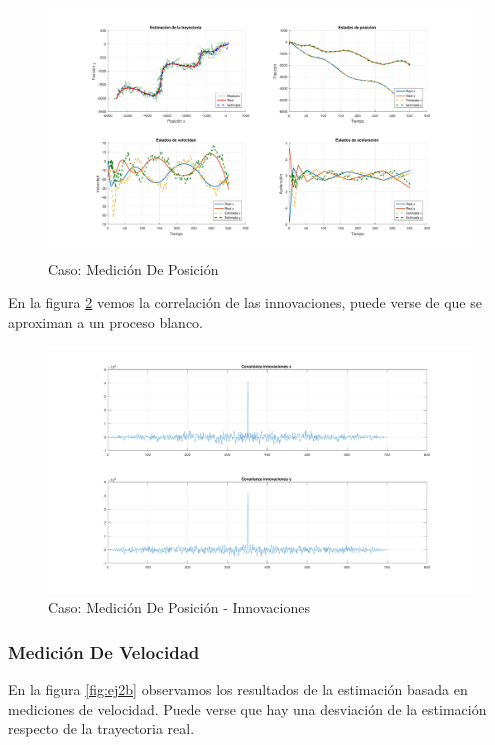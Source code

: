 		\begin{figure}[H]
			\centering
			\includegraphics[width=1.0\textwidth,keepaspectratio]{Figuras/graf_ej2a.pdf}
			\caption{Caso: Medición De Posición}
			\label{fig:ej2a}
		\end{figure}
		
		En la figura \ref{fig:ej2a_innov} vemos la correlación de las innovaciones, puede verse de que se aproximan a un proceso blanco.
		
		\begin{figure}[H]
			\centering
			\includegraphics[width=1.0\textwidth,keepaspectratio]{Figuras/covinn_ej2a.pdf}
			\caption{Caso: Medición De Posición - Innovaciones}
			\label{fig:ej2a_innov}
		\end{figure}
		
		\subsubsection{Medición De Velocidad}
		
		En la figura \ref{fig:ej2b} observamos los resultados de la estimación basada en mediciones de velocidad. Puede verse que hay una desviación de la estimación respecto de la trayectoria real.
		

